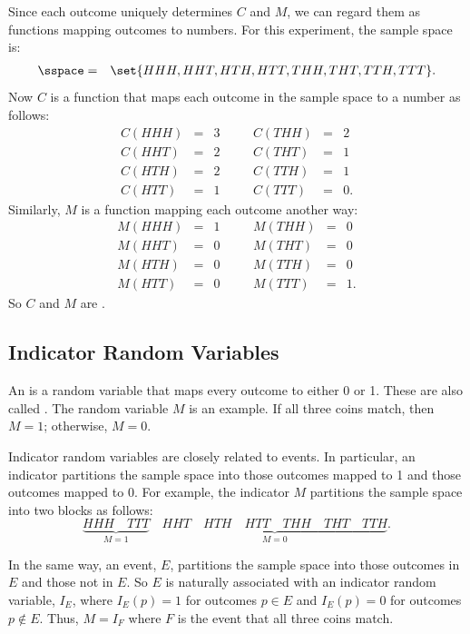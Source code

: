 Since each outcome uniquely determines $C$ and $M$, we can regard them
as functions mapping outcomes to numbers.  For this experiment, the
sample space is:
\begin{eqnarray*}
\sspace & = & \set{ HHH, HHT, HTH, HTT, THH, THT, TTH, TTT }.
\end{eqnarray*}
Now $C$ is a function that maps each outcome in the sample space to a 
number as follows:
\[
\begin{array}{rclcrcl}
C(HHH) & = & 3 & \quad & C(THH) & = & 2 \\
C(HHT) & = & 2 & \quad & C(THT) & = & 1 \\
C(HTH) & = & 2 & \quad & C(TTH) & = & 1 \\
C(HTT) & = & 1 & \quad & C(TTT) & = & 0.
\end{array}
\]
Similarly, $M$ is a function mapping each outcome another way:
\[
\begin{array}{rclcrcl}
M(HHH) & = & 1 & \quad & M(THH) & = & 0 \\
M(HHT) & = & 0 & \quad & M(THT) & = & 0 \\
M(HTH) & = & 0 & \quad & M(TTH) & = & 0 \\
M(HTT) & = & 0 & \quad & M(TTT) & = & 1.
\end{array}
\]
So $C$ and $M$ are .

\subsection{Indicator Random Variables}

An  is a random variable that maps every
outcome to either 0 or 1.  These are also called .  The random variable $M$ is an example.  If all three coins
match, then $M=1$; otherwise, $M = 0$.

Indicator random variables are closely related to events.  In
particular, an indicator partitions the sample space into those
outcomes mapped to 1 and those outcomes mapped to 0.  For example, the
indicator $M$ partitions the sample space into two blocks as follows:
\[
\underbrace{HHH \quad TTT}_{\text{$M = 1$}} \quad
\underbrace{HHT \quad HTH \quad HTT \quad
        THH \quad THT \quad TTH}_{\text{$M = 0$}}.
\]

In the same way, an event, $E$, partitions the sample space into those
outcomes in $E$ and those not in $E$.  So $E$ is naturally associated with
an indicator random variable, 
$I_E$, where $I_E(p) = 1$ for outcomes $p \in E$ and $I_E(p) = 0$ for
outcomes $p \notin E$.  Thus, $M=I_F$ where $F$ is the event that all
three coins match.

